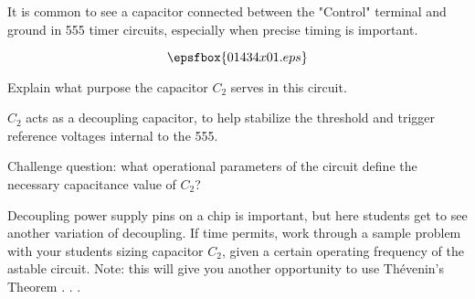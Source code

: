 

It is common to see a capacitor connected between the "Control" terminal and ground in 555 timer circuits, especially when precise timing is important.  

$$\epsfbox{01434x01.eps}$$

Explain what purpose the capacitor $C_2$ serves in this circuit.







$C_2$ acts as a decoupling capacitor, to help stabilize the threshold and trigger reference voltages internal to the 555.

\vskip 10pt

Challenge question: what operational parameters of the circuit define the necessary capacitance value of $C_2$?







Decoupling power supply pins on a chip is important, but here students get to see another variation of decoupling.  If time permits, work through a sample problem with your students sizing capacitor $C_2$, given a certain operating frequency of the astable circuit.  Note: this will give you another opportunity to use Th\'evenin's Theorem . . .




